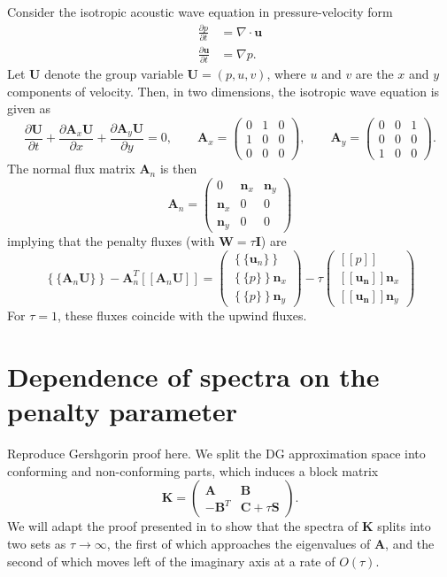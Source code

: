 \documentclass[10pt]{article}
\newcommand{\pd}[2]{\frac{\partial#1}{\partial#2}}
\newcommand{\LRs}[1]{\left[ #1 \right]}
\newcommand{\LRc}[1]{\left\{ #1 \right\}}
\newcommand{\Grad} {\ensuremath{\nabla}}
\newcommand{\Div} {\ensuremath{\nabla\cdot}}
\newcommand{\jump}[1] {\ensuremath{\LRs{\![#1]\!}}}
\newcommand{\avg}[1] {\ensuremath{\LRc{\!\{#1\}\!}}}
\newcommand{\note}[1]{{\color{blue}#1}}
\begin{document}
Consider the isotropic acoustic wave equation in pressure-velocity form
\begin{align*}
\pd{p}{t} &= \Div \bm{u}\\
\pd{\bm{u}}{t} &= \Grad p.
\end{align*}
Let $\bm{U}$ denote the group variable $\bm{U} = (p,u,v)$, where $u$ and $v$ are the $x$ and $y$ components of velocity.  Then, in two dimensions, the isotropic wave equation is given as
\[
\pd{\bm{U}}{t} + \pd{\bm{A}_x\bm{U}}{x} + \pd{\bm{A}_y\bm{U}}{y} = 0, \qquad \bm{A}_x = 
\left(\begin{array}{ccc}
0 & 1 & 0\\
1 & 0 & 0\\
0 & 0 & 0
\end{array}
\right), \qquad 
\bm{A}_y = 
\left(\begin{array}{ccc}
0 & 0 & 1\\
0 & 0 & 0\\
1 & 0 & 0
\end{array}
\right).
\]
The normal flux matrix $\bm{A}_n$ is then
\[
\bm{A}_n = 
\left(\begin{array}{ccc}
0 & \bm{n}_x & \bm{n}_y\\
\bm{n}_x & 0 & 0\\
\bm{n}_y & 0 & 0
\end{array}
\right)
\]
implying that the penalty fluxes (with $\bm{W} = \tau\bm{I}$) are 
\[
\avg{\bm{A}_n \bm{U}} - \bm{A}_n^T \jump{\bm{A}_n\bm{U}} = \left(\begin{array}{c}
\avg{\bm{u}_n}\\
\avg{p }\bm{n}_x\\
\avg{p }\bm{n}_y
\end{array}
\right) - 
\tau\left(\begin{array}{c}
\jump{p}\\
\jump{\bm{u_n}}\bm{n}_x\\
\jump{\bm{u_n}}\bm{n}_y
\end{array}
\right)
\]
For $\tau = 1$, these fluxes coincide with the upwind fluxes.  

\section{Dependence of spectra on the penalty parameter}

\note{Reproduce Gershgorin proof here.}
We split the DG approximation space into conforming and non-conforming parts, which induces a block matrix
\[
\bm{K} = \left(\begin{array}{cc}
\bm{A} & \bm{B}\\
-\bm{B}^T & \bm{C} + \tau \bm{S}
\end{array}\right).
\]
We will adapt the proof presented in \cite{Warburton20063205} to show that the spectra of $\bm{K}$ splits into two sets as $\tau\rightarrow \infty$, the first of which approaches the eigenvalues of $\bm{A}$, and the second of which moves left of the imaginary axis at a rate of $O(\tau)$.  
\end{document}
